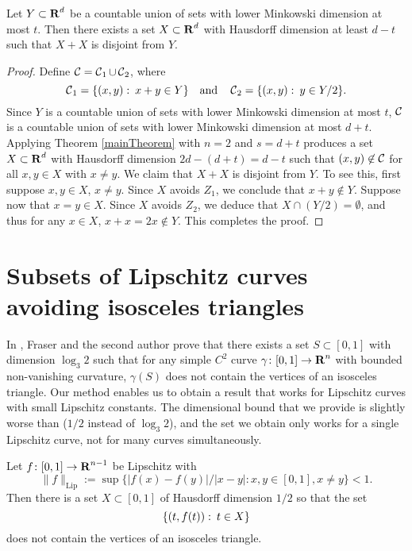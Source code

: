 \begin{theorem} \label{sumset-application} 
	Let $Y \subset \operatorname{\mathbf{R}}^d$ be a countable union of sets with lower Minkowski dimension at most $t$. Then there exists a set $X \subset \operatorname{\mathbf{R}}^d$ with Hausdorff dimension at least $d - t$ such that $X + X$ is disjoint from $Y$.
\end{theorem}
\begin{proof}
	Define $\operatorname{\mathcal{C}} = \operatorname{\mathcal{C}}_1 \cup \operatorname{\mathcal{C}}_2$, where
	\[ \operatorname{\mathcal{C}}_1 = \{ (x,y) \operatorname{\colon} x + y \in Y \} \quad \text{and} \quad \operatorname{\mathcal{C}}_2 = \{ (x,y) \operatorname{\colon} y \in Y/2 \}. \]
	Since $Y$ is a countable union of sets with lower Minkowski dimension at most $t$, $\operatorname{\mathcal{C}}$ is a countable union of sets with lower Minkowski dimension at most $d + t$. Applying Theorem \ref{mainTheorem} with $n = 2$ and $s = d + t$ produces a set $X \subset \operatorname{\mathbf{R}}^d$ with Hausdorff dimension $2d  - (d + t) = d - t$ such that $(x,y) \not \in \operatorname{\mathcal{C}}$ for all $x,y \in X$ with $x \neq y$. We claim that $X+ X$ is disjoint from $Y$. To see this, first suppose $x, y \in X$, $x \neq y$. Since $X$ avoids $Z_1$, we conclude that $x + y \not \in Y$. Suppose now that $x = y \in X$. Since $X$ avoids $Z_2$, we deduce that $X \cap (Y/2) = \emptyset$, and thus for any $x \in X$, $x + x = 2x \not \in Y$. This completes the proof.
\end{proof}


\section{Subsets of Lipschitz curves avoiding isosceles triangles}

In \cite{MalabikaRob}, Fraser and the second author prove that there exists a set $S \subset [0,1]$ with dimension $\log_3 2$ such that for any simple $C^2$ curve $\gamma \colon [0,1] \to \operatorname{\mathbf{R}}^n$ with bounded non-vanishing curvature, $\gamma(S)$ does not contain the vertices of an isosceles triangle. Our method enables us to obtain a result that works for Lipschitz curves with small Lipschitz constants. The dimensional bound that we provide is slightly worse than \cite{MalabikaRob} ($1/2$ instead of $\log_3 2$), and the set we obtain only works for a single Lipschitz curve, not for many curves simultaneously.

\begin{theorem} \label{C1IsoscelesThm}
	Let $f \colon [0,1] \to \operatorname{\mathbf{R}}^{n-1}$ be Lipschitz with \[ \| f \|_{\text{Lip}}  := \sup \bigl\{|f(x) - f(y)|/|x-y| : x, y \in [0,1], x \ne y   \bigr\} < 1. \]  Then there is a set $X \subset [0,1]$ of Hausdorff dimension $1/2$ so that the set
	\[ \{(t,f(t)) \operatorname{\colon} t\in X\} \]
	does not contain the vertices of an isosceles triangle.
\end{theorem}

